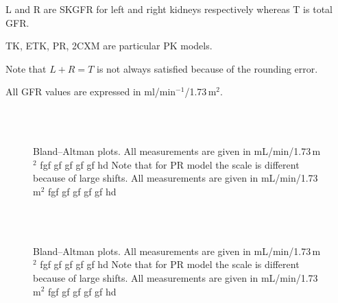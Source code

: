 \begin{landscape}
\begin{table}[H]
\begin{threeparttable}
\begin{tabular}
  \bottomrule

\end{tabular}
\begin{tablenotes}%
\footnotesize{}%
\item L and R are SKGFR for left and right kidneys respectively whereas T is total GFR.
\item TK, ETK, PR, 2CXM are particular PK models. 
\item Note that $L+R = T$ is not always satisfied because of the rounding error.
\item All GFR values are expressed in ml/min$^{-1}$/1.73\,m$^2$.
    \end{tablenotes}
	\end{threeparttable}
\end{table}
\end{landscape}


\begin{figure}[H]
	\centering
	 \\ \vspace{10pt}  
 	 \hfill {} \\ \vspace{10pt}   
	 \hfill {}

\caption[Bland–Altman plots]{Bland–Altman plots. All measurements are given in mL/min/1.73\,m$^2$ fgf gf gf gf gf hd Note that for PR model the scale is different because of large shifts. All measurements are given in mL/min/1.73\,m$^2$ fgf gf gf gf gf hd } 
\label{fig:baltman}
\end{figure}


\begin{figure}[H]
	\centering
	 \\ \vspace{10pt}  
 	 \hfill {} \\ \vspace{10pt}   
	 \hfill {}

\caption[Bland–Altman plots]{Bland–Altman plots. All measurements are given in mL/min/1.73\,m$^2$ fgf gf gf gf gf hd Note that for PR model the scale is different because of large shifts. All measurements are given in mL/min/1.73\,m$^2$ fgf gf gf gf gf hd } 
\label{fig:baltman}
\end{figure}
  

